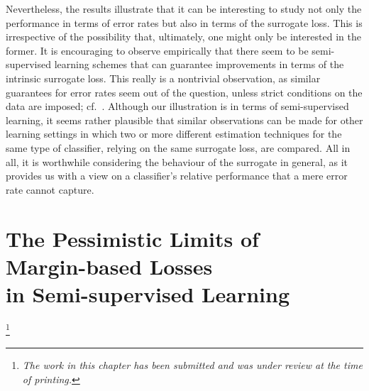 \documentclass[twoside]{memoir}\usepackage[]{graphicx}\usepackage{xcolor}
\renewcommand{\cite}{\citep}
\newcommand\blfootnote[1]{%
  \begingroup
  \renewcommand\thefootnote{}\footnote{\itshape#1}%
  \addtocounter{footnote}{-1}%
  \endgroup
}
\begin{document}
Nevertheless, the results illustrate that it can be interesting to study not only the performance in terms of error rates but also in terms of the surrogate loss.  This is irrespective of the possibility that, ultimately, one might only be interested in the former.  It is encouraging to observe empirically that there seem to be semi-supervised learning schemes that can guarantee improvements in terms of the intrinsic surrogate loss.  This really is a nontrivial observation, as similar guarantees for error rates seem out of the question, unless strict conditions on the data are imposed; cf.\ \cite{Castelli1995,Ben-David2008,Lafferty2007,Singh2008}. Although our illustration is in terms of semi-supervised learning, it seems rather plausible that similar observations can be made for other learning settings in which two or more different estimation techniques for the same type of classifier, relying on the same surrogate loss, are compared.  All in all, it is worthwhile considering the behaviour of the surrogate in general, as it provides us with a view on a classifier's relative performance that a mere error rate cannot capture.

\chapter[The Pessimistic Limits of Margin-based Losses in Semi-supervised Learning]{The Pessimistic Limits of\\Margin-based Losses\\in Semi-supervised Learning}
\label{chapter:marginbased}
\blfootnote{The work in this chapter has been submitted and was under review at the time of printing.}
\end{document}
